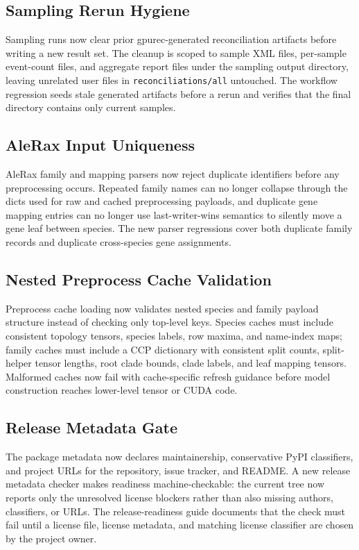 \documentclass[11pt]{article}
\begin{document}
\subsection{Sampling Rerun Hygiene}

Sampling runs now clear prior gpurec-generated reconciliation artifacts before
writing a new result set.  The cleanup is scoped to sample XML files,
per-sample event-count files, and aggregate report files under the sampling
output directory, leaving unrelated user files in \texttt{reconciliations/all}
untouched.  The workflow regression seeds stale generated artifacts before a
rerun and verifies that the final directory contains only current samples.

\subsection{AleRax Input Uniqueness}

AleRax family and mapping parsers now reject duplicate identifiers before any
preprocessing occurs.  Repeated family names can no longer collapse through the
dicts used for raw and cached preprocessing payloads, and duplicate gene
mapping entries can no longer use last-writer-wins semantics to silently move a
gene leaf between species.  The new parser regressions cover both duplicate
family records and duplicate cross-species gene assignments.

\subsection{Nested Preprocess Cache Validation}

Preprocess cache loading now validates nested species and family payload
structure instead of checking only top-level keys.  Species caches must include
consistent topology tensors, species labels, row maxima, and name-index maps;
family caches must include a CCP dictionary with consistent split counts,
split-helper tensor lengths, root clade bounds, clade labels, and leaf mapping
tensors.  Malformed caches now fail with cache-specific refresh guidance before
model construction reaches lower-level tensor or CUDA code.

\subsection{Release Metadata Gate}

The package metadata now declares maintainership, conservative PyPI classifiers,
and project URLs for the repository, issue tracker, and README.  A new release
metadata checker makes readiness machine-checkable: the current tree now reports
only the unresolved license blockers rather than also missing authors,
classifiers, or URLs.  The release-readiness guide documents that the check must
fail until a license file, license metadata, and matching license classifier are
chosen by the project owner.
\end{document}
